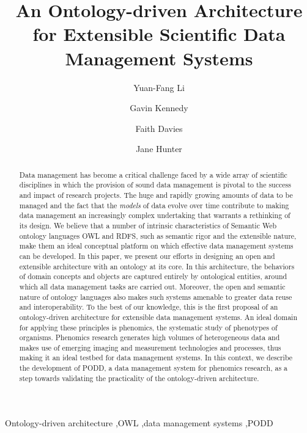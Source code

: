 \documentclass{elsarticle}
\begin{document}
\begin{frontmatter}

\title{An Ontology-driven Architecture for Extensible Scientific Data Management Systems}

\author{Yuan-Fang Li}
\author{Gavin Kennedy}
\author{Faith Davies}
\author{Jane Hunter}


\address{School of ITEE, The University of Queensland\\
GP South, Staff House Road, St Lucia 4072, Australia}

\begin{abstract}
Data management has become a critical challenge faced by a wide
array of scientific disciplines in which the provision of sound data
management is pivotal to the success and impact of research
projects. The huge and rapidly growing amounts of data to be managed
and the fact that the \emph{models} of data evolve over time
contribute to making data management an increasingly complex
undertaking that warrants a rethinking of its design. We believe
that a number of intrinsic characteristics of Semantic Web ontology
languages OWL and RDFS, such as semantic rigor and the extensible
nature, make them an ideal conceptual platform on which effective
data management systems can be developed. In this paper, we present
our efforts in designing an open and extensible architecture with an
ontology at its core. In this architecture, the behaviors of domain
concepts and objects are captured entirely by ontological entities,
around which all data management tasks are carried out. Moreover,
the open and semantic nature of ontology languages also makes such
systems amenable to greater data reuse and interoperability. To the
best of our knowledge, this is the first proposal of an
ontology-driven architecture for extensible data management systems.
An ideal domain for applying these principles is phenomics, the
systematic study of phenotypes of organisms. Phenomics research
generates high volumes of heterogeneous data and makes use of
emerging imaging and measurement technologies and processes, thus
making it an ideal testbed for data management systems. In this
context, we describe the development of PODD, a data management
system for phenomics research, as a step towards validating the
practicality of the ontology-driven architecture.
\end{abstract}

\begin{keyword}
Ontology-driven architecture \sep OWL \sep data management systems \sep PODD
\end{keyword}

\end{frontmatter}
\end{document}
